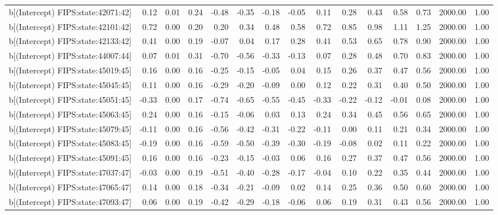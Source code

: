 \begin{table}[ht]
\begin{tabular}{rrrrrrrrrrrrrrr}
  b[(Intercept) FIPS:state:42071:42] & 0.12 & 0.01 & 0.24 & -0.48 & -0.35 & -0.18 & -0.05 & 0.11 & 0.28 & 0.43 & 0.58 & 0.73 & 2000.00 & 1.00 \\ 
  b[(Intercept) FIPS:state:42101:42] & 0.72 & 0.00 & 0.20 & 0.20 & 0.34 & 0.48 & 0.58 & 0.72 & 0.85 & 0.98 & 1.11 & 1.25 & 2000.00 & 1.00 \\ 
  b[(Intercept) FIPS:state:42133:42] & 0.41 & 0.00 & 0.19 & -0.07 & 0.04 & 0.17 & 0.28 & 0.41 & 0.53 & 0.65 & 0.78 & 0.90 & 2000.00 & 1.00 \\ 
  b[(Intercept) FIPS:state:44007:44] & 0.07 & 0.01 & 0.31 & -0.70 & -0.56 & -0.33 & -0.13 & 0.07 & 0.28 & 0.48 & 0.70 & 0.83 & 2000.00 & 1.00 \\ 
  b[(Intercept) FIPS:state:45019:45] & 0.16 & 0.00 & 0.16 & -0.25 & -0.15 & -0.05 & 0.04 & 0.15 & 0.26 & 0.37 & 0.47 & 0.56 & 2000.00 & 1.00 \\ 
  b[(Intercept) FIPS:state:45045:45] & 0.11 & 0.00 & 0.16 & -0.29 & -0.20 & -0.09 & 0.00 & 0.12 & 0.22 & 0.31 & 0.40 & 0.50 & 2000.00 & 1.00 \\ 
  b[(Intercept) FIPS:state:45051:45] & -0.33 & 0.00 & 0.17 & -0.74 & -0.65 & -0.55 & -0.45 & -0.33 & -0.22 & -0.12 & -0.01 & 0.08 & 2000.00 & 1.00 \\ 
  b[(Intercept) FIPS:state:45063:45] & 0.24 & 0.00 & 0.16 & -0.15 & -0.06 & 0.03 & 0.13 & 0.24 & 0.34 & 0.45 & 0.56 & 0.65 & 2000.00 & 1.00 \\ 
  b[(Intercept) FIPS:state:45079:45] & -0.11 & 0.00 & 0.16 & -0.56 & -0.42 & -0.31 & -0.22 & -0.11 & 0.00 & 0.11 & 0.21 & 0.34 & 2000.00 & 1.00 \\ 
  b[(Intercept) FIPS:state:45083:45] & -0.19 & 0.00 & 0.16 & -0.59 & -0.50 & -0.39 & -0.30 & -0.19 & -0.08 & 0.02 & 0.11 & 0.22 & 2000.00 & 1.00 \\ 
  b[(Intercept) FIPS:state:45091:45] & 0.16 & 0.00 & 0.16 & -0.23 & -0.15 & -0.03 & 0.06 & 0.16 & 0.27 & 0.37 & 0.47 & 0.56 & 2000.00 & 1.00 \\ 
  b[(Intercept) FIPS:state:47037:47] & -0.03 & 0.00 & 0.19 & -0.51 & -0.40 & -0.28 & -0.17 & -0.04 & 0.10 & 0.22 & 0.35 & 0.44 & 2000.00 & 1.00 \\ 
  b[(Intercept) FIPS:state:47065:47] & 0.14 & 0.00 & 0.18 & -0.34 & -0.21 & -0.09 & 0.02 & 0.14 & 0.25 & 0.36 & 0.50 & 0.60 & 2000.00 & 1.00 \\ 
  b[(Intercept) FIPS:state:47093:47] & 0.06 & 0.00 & 0.19 & -0.42 & -0.29 & -0.18 & -0.06 & 0.06 & 0.19 & 0.31 & 0.43 & 0.56 & 2000.00 & 1.00 \\ 

\end{tabular}
\end{table}
